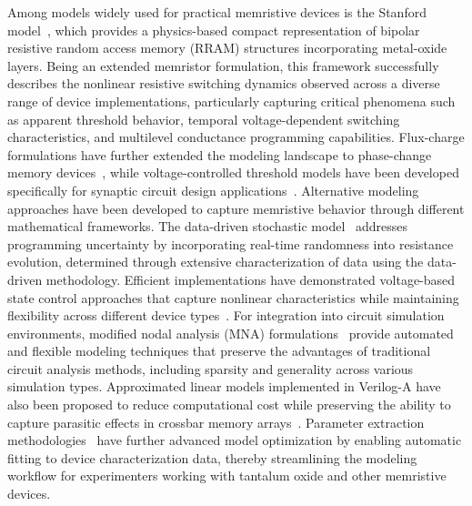 \documentclass{ieeeaccess}
\begin{document}
Among models widely used for practical memristive devices is the Stanford model~\cite{sheridan2011device, guan2012spice, chen2015compact, di2022oscillatory}, which provides a physics-based compact representation of bipolar resistive random access memory (RRAM) structures incorporating metal-oxide layers. Being an extended memristor formulation, this framework successfully describes the nonlinear resistive switching dynamics observed across a diverse range of device implementations, particularly capturing critical phenomena such as apparent threshold behavior, temporal voltage-dependent switching characteristics, and multilevel conductance programming capabilities. Flux-charge formulations have further extended the modeling landscape to phase-change memory devices~\cite{Secco2018}, while voltage-controlled threshold models have been developed specifically for synaptic circuit design applications~\cite{Zhang2017}. Alternative modeling approaches have been developed to capture memristive behavior through different mathematical frameworks. The data-driven stochastic model~\cite{xie2024data} addresses programming uncertainty by incorporating real-time randomness into resistance evolution, determined through extensive characterization of data using the data-driven methodology. Efficient implementations have demonstrated voltage-based state control approaches that capture nonlinear characteristics while maintaining flexibility across different device types~\cite{wang2017efficient}. For integration into circuit simulation environments, modified nodal analysis (MNA) formulations~\cite{kahale2021memristor} provide automated and flexible modeling techniques that preserve the advantages of traditional circuit analysis methods, including sparsity and generality across various simulation types. Approximated linear models implemented in Verilog-A have also been proposed to reduce computational cost while preserving the ability to capture parasitic effects in crossbar memory arrays~\cite{Lupo2019}. Parameter extraction methodologies~\cite{yakopcic2019memristor} have further advanced model optimization by enabling automatic fitting to device characterization data, thereby streamlining the modeling workflow for experimenters working with tantalum oxide and other memristive devices.
\end{document}
